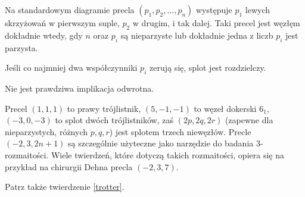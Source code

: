 Na standardowym diagramie precla $(p_1, p_2, \ldots, p_n)$ występuje $p_1$ lewych skrzyżowań w pierwszym suple, $p_2$ w drugim, i tak dalej.
Taki precel jest węzłęm dokładnie wtedy, gdy $n$ oraz $p_i$ są nieparzyste lub dokładnie jedna z liczb $p_i$ jest parzysta.

\begin{proposition}
	Jeśli co najmniej dwa współczynniki $p_i$ zerują się, splot jest rozdzielczy.
\end{proposition}

Nie jest prawdziwa implikacja odwrotna.

Precel $(1,1,1)$ to prawy trójlistnik, $(5, -1, -1)$ to węzeł dokerski $6_1$, $(-3, 0, -3)$ to splot dwóch trójlistników, zaś $(2p, 2q, 2r)$ (zapewne dla nieparzystych, różnych $p, q, r$) jest splotem trzech niewęzłów.
Precle $(-2, 3, 2n+1)$ są szczególnie użyteczne jako narzędzie do badania 3-rozmaitości.
Wiele twierdzeń, które dotyczą takich rozmaitości, opiera się na przykład na chirurgii Dehna precla $(-2, 3, 7)$.

Patrz także twierdzenie \ref{trotter}.
